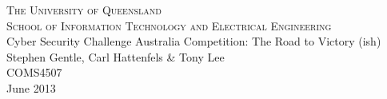 \documentclass[11pt,a4paper,oneside]{book}
\begin{document}
\frontmatter

\begin{titlepage}
\begin{center}

\textsc{\LARGE The University of Queensland}\\[0.4cm]

\textsc{\Large School of Information Technology and Electrical Engineering}\\[2cm]

{\huge Cyber Security Challenge Australia Competition: The Road to Victory (ish)}\\[1.8cm]

{\Large Stephen Gentle, Carl Hattenfels \& Tony Lee}\\[1.5cm]
{\large COMS4507}\\[0.5cm]
{\large June 2013}\\[5.4cm]

\end{center}

\end{titlepage}

\cleardoublepage



\tableofcontents
\listoffigures
\listoftables

\mainmatter











\clearpage
%
\end{document}
